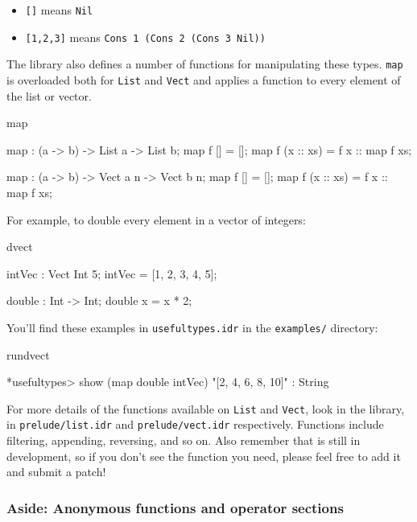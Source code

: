 \begin{itemize}
\item \texttt{[]} means \texttt{Nil}
\item \texttt{[1,2,3]} means \texttt{Cons 1 (Cons 2 (Cons 3 Nil))}
\end{itemize}

The library also defines a number of functions for manipulating these types.
\texttt{map} is overloaded both for \texttt{List} and \texttt{Vect}
and applies a function to every element of the list or vector.

\begin{SaveVerbatim}{map}

map : (a -> b) -> List a -> List b;
map f []        = [];
map f (x :: xs) = f x :: map f xs;

map : (a -> b) -> Vect a n -> Vect b n;
map f []        = [];
map f (x :: xs) = f x :: map f xs;

\end{SaveVerbatim}

\noindent
For example, to double every element in a vector of integers:

\begin{SaveVerbatim}{dvect}

intVec : Vect Int 5;
intVec = [1, 2, 3, 4, 5];

double : Int -> Int;
double x = x * 2;

\end{SaveVerbatim}

\noindent
You'll find these examples in \texttt{usefultypes.idr} in the \texttt{examples/} directory:

\begin{SaveVerbatim}{rundvect}

*usefultypes> show (map double intVec) 
"[2, 4, 6, 8, 10]" : String

\end{SaveVerbatim}

For more details of the functions available on \texttt{List} and \texttt{Vect},
look in the library, in \texttt{prelude/list.idr} and \texttt{prelude/vect.idr} respectively.
Functions include filtering, appending, reversing, and so on. Also remember
that \Idris{} is still in development, so if you don't see the function you
need, please feel free to add it and submit a patch!

\subsubsection*{Aside: Anonymous functions and operator sections}


